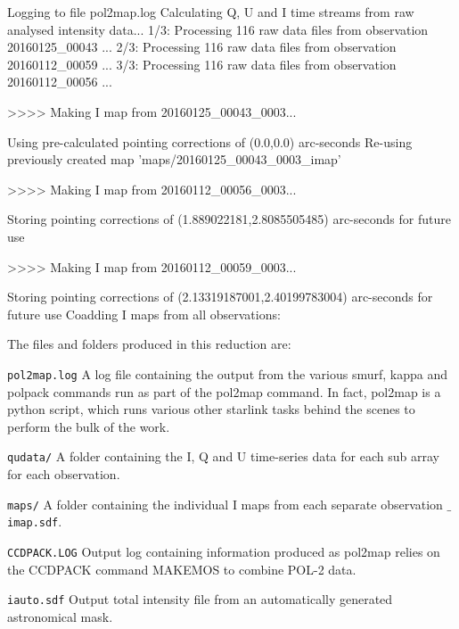 \begin{terminalv}
Logging to file pol2map.log
Calculating Q, U and I time streams from raw analysed intensity data...
   1/3: Processing 116 raw data files from observation 20160125_00043 ...
   2/3: Processing 116 raw data files from observation 20160112_00059 ...
   3/3: Processing 116 raw data files from observation 20160112_00056 ...

>>>>   Making I map from 20160125_00043_0003...

   Using pre-calculated pointing corrections of (0.0,0.0) arc-seconds
   Re-using previously created map 'maps/20160125_00043_0003_imap'

>>>>   Making I map from 20160112_00056_0003...

Storing pointing corrections of (1.889022181,2.8085505485) arc-seconds for future use

>>>>   Making I map from 20160112_00059_0003...

Storing pointing corrections of (2.13319187001,2.40199783004) arc-seconds for future use
Coadding I maps from all observations:
\end{terminalv}

The files and folders produced in this reduction are:


\begin{aligndesc}
\item[\texttt{pol2map.log}] A log file containing the output from the
  various smurf, kappa and polpack commands run as part of the pol2map
  command. In fact, pol2map is a python script, which runs various other
  starlink tasks behind the scenes to perform the bulk of the work.

\item[\texttt{qudata/}] A folder containing the I, Q and U time-series data
  for each sub array for each observation.

\item[\texttt{maps/}] A folder containing the individual I maps from
  each separate observation \texttt{$\_$imap.sdf}.

\item[\texttt{CCDPACK.LOG}] Output log containing information produced
  as pol2map relies on the CCDPACK command MAKEMOS to combine POL-2
  data.

\item[\texttt{iauto.sdf}] Output total intensity file from an
  automatically generated astronomical mask.


\end{aligndesc}

